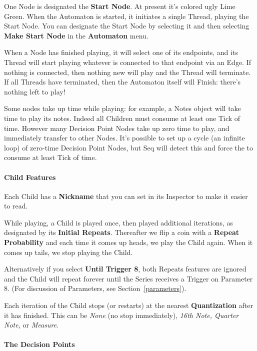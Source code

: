 \documentclass[twoside,10pt]{article}
\begin{document}
One Node is designated the {\bf Start Node}.  At present it's colored ugly Lime Green.  When the Automaton is started, it initiates a single Thread, playing the Start Node.  You can designate the Start Node by selecting it and then selecting {\bf Make Start Node} in the {\bf Automaton} menu.

When a Node has finished playing, it will select one of its endpoints, and its Thread will start playing whatever is connected to that endpoint via an Edge.  If nothing is connected, then nothing new will play and the Thread will terminate.  If all Threads have terminated, then the Automaton itself will Finish: there's nothing left to play!

Some nodes take up time while playing: for example, a Notes object will take time to play its notes.  Indeed all Children must consume at least one Tick of time.  However many Decision Point Nodes take up zero time to play, and immediately transfer to other Nodes.  It's possible to set up a cycle (an infinite loop) of zero-time Decision Point Nodes, but Seq will detect this and force the to consume at least Tick of time.

\paragraph{Child Features}

Each Child has a {\bf Nickname} that you can set in its Inspector to make it easier to read.

While playing, a Child is played once, then played additional iterations, as designated by its {\bf Initial Repeats}.  Thereafter we flip a coin with a {\bf Repeat Probability} and each time it comes up heads, we play the Child again.  When it comes up tails, we stop playing the Child.

Alternatively if you select {\bf Until Trigger 8}, both Repeats features are ignored and the Child  will repeat forever until the Series receives a Trigger on Parameter 8.  (For discussion of Parameters, see Section~\ref{parameters}).

Each iteration of the Child stops (or restarts) at the nearest {\bf Quantization} after it has finished.  This can be {\it None} (no stop immediately), {\it 16th Note, Quarter Note,} or {\it Measure}.



\paragraph{The Decision Points}
\end{document}
